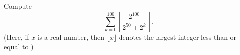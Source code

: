 Compute \[\sum_{k=0}^{100}\left\lfloor\dfrac{2^{100}}{2^{50}+2^k}\right\rfloor.\] (Here, if $x$ is a real number, then $\lfloor x\rfloor$ denotes the largest integer less than or equal to )
